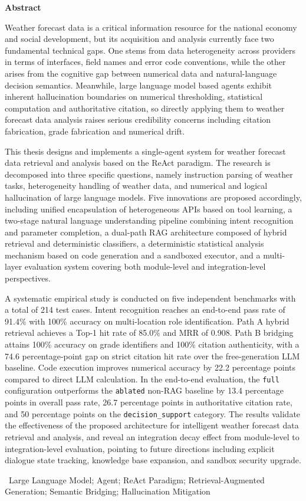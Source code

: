 \documentclass[a4paper]{article}
\newcommand{\song}{\CJKfamily{song}}
\newcommand{\xiaoerhao}{\fontsize{18pt}{\baselineskip}\selectfont}
\newcommand{\xiaosihao}{\fontsize{12pt}{18pt}\selectfont}
\newcommand{\sectionbreak}{\clearpage} %
\newcommand\seccontent{
	\song
	\xiaosihao %
    \setlength{\parindent}{2em} %
    \setlength{\parskip}{0pt}
    }
\theoremstyle{definition}
\theoremstyle{plain}
\theoremstyle{remark}
\newenvironment{enabstract}[1]{
	\def \enkeyword {#1}
	\clearpage
	\phantomsection
	\addcontentsline{toc}{section}{Abstract}
	\vspace*{-40pt}
	\begin{center}
		\bfseries \xiaoerhao Abstract
	\end{center}
	\seccontent
	\linespread{1.1}\selectfont
	\setlength{\parskip}{0pt}
}{
	\par\noindent {\xiaosihao\bfseries Key Words: }\ {\song\xiaosihao\enkeyword}
}
\begin{document}
\begin{enabstract}{Large Language Model; Agent; ReAct Paradigm; Retrieval-Augmented Generation; Semantic Bridging; Hallucination Mitigation}

	Weather forecast data is a critical information resource for the
	national economy and social development, but its acquisition and analysis
	currently face two fundamental technical gaps. One stems from data
	heterogeneity across providers in terms of interfaces, field names and error
	code conventions, while the other arises from the cognitive gap between
	numerical data and natural-language decision semantics. Meanwhile, large
	language model based agents exhibit inherent hallucination boundaries on
	numerical thresholding, statistical computation and authoritative citation,
	so directly applying them to weather forecast data analysis raises serious
	credibility concerns including citation fabrication, grade fabrication and
	numerical drift.

	This thesis designs and implements a single-agent system for
	weather forecast data retrieval and analysis based on the ReAct paradigm. The
	research is decomposed into three specific questions, namely instruction
	parsing of weather tasks, heterogeneity handling of weather data, and
	numerical and logical hallucination of large language models. Five innovations
	are proposed accordingly, including unified encapsulation of heterogeneous
	APIs based on tool learning, a two-stage natural language understanding
	pipeline combining intent recognition and parameter completion, a dual-path
	RAG architecture composed of hybrid retrieval and deterministic classifiers,
	a deterministic statistical analysis mechanism based on code generation and
	a sandboxed executor, and a multi-layer evaluation system covering both
	module-level and integration-level perspectives.

	A systematic empirical study is conducted on five independent
	benchmarks with a total of 214 test cases. Intent recognition reaches an
	end-to-end pass rate of 91.4\% with 100\% accuracy on multi-location role
	identification. Path A hybrid retrieval achieves a Top-1 hit rate of 85.0\%
	and MRR of 0.908. Path B bridging attains 100\% accuracy on grade identifiers
	and 100\% citation authenticity, with a 74.6 percentage-point gap on strict
	citation hit rate over the free-generation LLM baseline. Code execution
	improves numerical accuracy by 22.2 percentage points compared to direct LLM
	calculation. In the end-to-end evaluation, the \texttt{full} configuration
	outperforms the \texttt{ablated} non-RAG baseline by 13.4 percentage points
	in overall pass rate, 26.7 percentage points in authoritative citation rate,
	and 50 percentage points on the \texttt{decision\_support} category. The
	results validate the effectiveness of the proposed architecture for
	intelligent weather forecast data retrieval and analysis, and reveal an
	integration decay effect from module-level to integration-level evaluation,
	pointing to future directions including explicit dialogue state tracking,
	knowledge base expansion, and sandbox security upgrade.
\end{enabstract}
\end{document}
